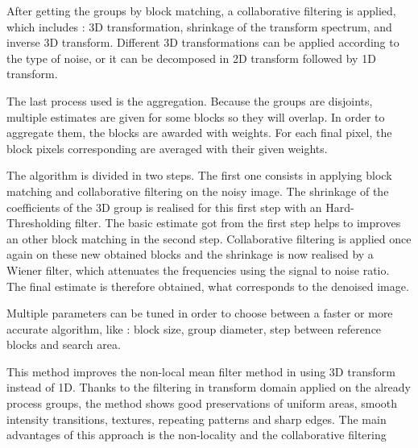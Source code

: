 After getting the groups by block matching, a collaborative filtering is applied, which includes : 3D transformation, shrinkage of the transform spectrum, and inverse 3D transform. Different 3D transformations can be applied according to the type of noise, or it can be decomposed in 2D transform followed by 1D transform.

The last process used is the aggregation. Because the groups are disjoints, multiple estimates are given for some blocks so they will overlap. In order to aggregate them, the blocks are awarded with weights. For each final pixel, the block pixels corresponding are averaged with their given weights.

The algorithm is divided in two steps. The first one consists in applying block matching and collaborative filtering on the noisy image. The shrinkage of the coefficients of the 3D group is realised for this first step with an Hard-Thresholding filter. The basic estimate got from the first step helps to improves an other block matching in the second step. Collaborative filtering is applied once again on these new obtained blocks and the shrinkage is now realised by a Wiener filter, which attenuates the frequencies using the signal to noise ratio. The final estimate is therefore obtained, what corresponds to the denoised image.

Multiple parameters can be tuned in order to choose between a faster or more accurate algorithm, like : block size, group diameter, step between reference blocks and search area.

This method improves the non-local mean filter method in using 3D transform instead of 1D. Thanks to the filtering in transform domain applied on the already process groups, the method shows good preservations of uniform areas, smooth intensity transitions, textures, repeating patterns and sharp edges. The main advantages of this approach is the non-locality and the collaborative filtering

